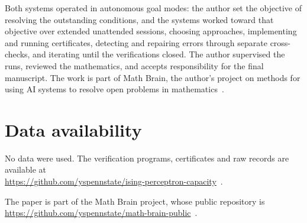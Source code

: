 \documentclass[11pt]{article}
\begin{document}
Both systems operated in autonomous goal modes: the author set the objective
of resolving the outstanding conditions, and the systems worked toward that
objective over extended unattended sessions, choosing approaches,
implementing and running certificates, detecting and repairing errors through
separate cross-checks, and iterating until the verifications closed. The
author supervised the runs, reviewed the mathematics, and accepts
responsibility for the final manuscript. The work is part of Math Brain,
the author's project on methods for using AI systems to resolve open problems
in mathematics~\cite{MathBrainPaper}.

\section*{Data availability}
No data were used. The verification programs, certificates and raw records
are available at\\ \url{https://github.com/yspennstate/ising-perceptron-capacity}~\cite{repo}.

The paper is part of the Math Brain project, whose public repository is \url{https://github.com/yspennstate/math-brain-public}~\cite{MathBrainRepo}.
\end{document}
